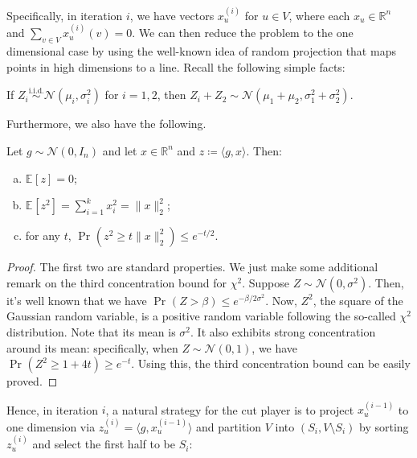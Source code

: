 Specifically, in iteration \(i\), we have vectors \(x^{(i)}_u\) for \(u \in V\), where each \(x_u \in \mathbb{R} ^n\) and \(\sum_{v \in V} x_u^{(i)}(v) = 0\). We can then reduce the problem to the one dimensional case by using the well-known idea of random projection that maps points in high dimensions to a line. Recall the following simple facts:

\begin{prev}
	If \(Z_i \overset{\text{i.i.d.} }{\sim } \mathcal{N} (\mu _i, \sigma _i^2)\) for \(i = 1, 2\), then \(Z_i + Z_2 \sim \mathcal{N} (\mu _1 + \mu _2, \sigma _1^2 + \sigma _2^2)\).
\end{prev}

Furthermore, we also have the following.

\begin{lemma}\label{lma:Gaussian-random-projection}
	Let \(g \sim \mathcal{N} (0, I_n)\) and let \(x \in \mathbb{R} ^n\) and \(z \coloneqq \langle g, x \rangle \). Then:
	\begin{enumerate}[(a)]
		\item \(\mathbb{E}_{}[z] = 0\);
		\item \(\mathbb{E}_{}[z^2] = \sum_{i=1}^{k} x_i^2 = \lVert x \rVert _2^2\);
		\item for any \(t\), \(\Pr_{}(z^2 \geq t \lVert x \rVert _2^2) \leq e^{-t / 2}\).
	\end{enumerate}
\end{lemma}
\begin{proof}
	The first two are standard properties. We just make some additional remark on the third concentration bound for \(\chi ^2\). Suppose \(Z \sim \mathcal{N} (0, \sigma ^2)\). Then, it's well known that we have \(\Pr_{}(Z > \beta ) \leq e^{- \beta / 2 \sigma ^2}\). Now, \(Z^2\), the square of the Gaussian random variable, is a positive random variable following the so-called \(\chi ^2\) distribution. Note that its mean is \(\sigma ^2\). It also exhibits strong concentration around its mean: specifically, when \(Z \sim \mathcal{N} (0, 1)\), we have \(\Pr_{}(Z^2 \geq 1 + 4t) \geq e^{-t}\). Using this, the third concentration bound can be easily proved.
\end{proof}

Hence, in iteration \(i\), a natural strategy for the cut player is to project \(x_u^{(i-1)}\) to one dimension via \(z_u^{(i)} = \langle g, x_u^{(i-1)} \rangle \) and partition \(V\) into \((S_i, V\setminus S_i)\) by sorting \(z_u^{(i)}\) and select the first half to be \(S_i\):

